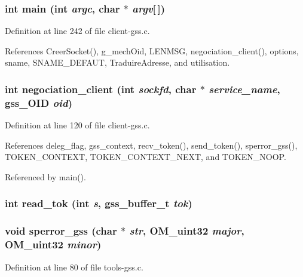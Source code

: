 \subsubsection{\setlength{\rightskip}{0pt plus 5cm}int main (int {\em argc}, char $\ast$ {\em argv}[$\,$])}\label{client-gss_8c_a25}




Definition at line 242 of file client-gss.c.

References Creer\-Socket(), g\_\-mech\-Oid, LENMSG, negociation\_\-client(), options, sname, SNAME\_\-DEFAUT, Traduire\-Adresse, and utilisation.
\subsubsection{\setlength{\rightskip}{0pt plus 5cm}int negociation\_\-client (int {\em sockfd}, char $\ast$ {\em service\_\-name}, gss\_\-OID {\em oid})}\label{client-gss_8c_a24}




Definition at line 120 of file client-gss.c.

References deleg\_\-flag, gss\_\-context, recv\_\-token(), send\_\-token(), sperror\_\-gss(), TOKEN\_\-CONTEXT, TOKEN\_\-CONTEXT\_\-NEXT, and TOKEN\_\-NOOP.

Referenced by main().
\subsubsection{\setlength{\rightskip}{0pt plus 5cm}int read\_\-tok (int {\em s}, gss\_\-buffer\_\-t {\em tok})}\label{client-gss_8c_a22}


\subsubsection{\setlength{\rightskip}{0pt plus 5cm}void sperror\_\-gss (char $\ast$ {\em str}, OM\_\-uint32 {\em major}, OM\_\-uint32 {\em minor})}\label{client-gss_8c_a20}




Definition at line 80 of file tools-gss.c.
